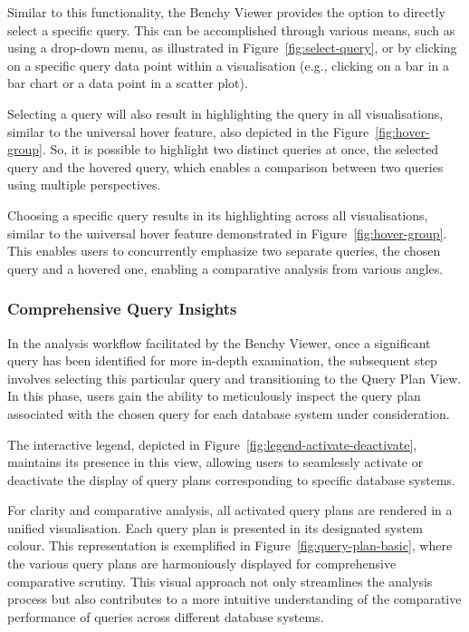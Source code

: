 Similar to this functionality, the Benchy Viewer provides the option to directly select a specific query. This can be accomplished through various means, such as using a drop-down menu, as illustrated in Figure~\ref{fig:select-query}, or by clicking on a specific query data point within a visualisation (e.g., clicking on a bar in a bar chart or a data point in a scatter plot).


Selecting a query will also result in highlighting the query in all visualisations, similar to the universal hover feature, also depicted in the Figure~\ref{fig:hover-group}. So, it is possible to highlight two distinct queries at once, the selected query and the hovered query, which enables a comparison between two queries using multiple perspectives. 

Choosing a specific query results in its highlighting across all visualisations, similar to the universal hover feature demonstrated in Figure~\ref{fig:hover-group}. This enables users to concurrently emphasize two separate queries, the chosen query and a hovered one, enabling a comparative analysis from various angles.

\subsubsection{Comprehensive Query Insights}

In the analysis workflow facilitated by the Benchy Viewer, once a significant query has been identified for more in-depth examination, the subsequent step involves selecting this particular query and transitioning to the Query Plan View. In this phase, users gain the ability to meticulously inspect the query plan associated with the chosen query for each database system under consideration.

The interactive legend, depicted in Figure~\ref{fig:legend-activate-deactivate}, maintains its presence in this view, allowing users to seamlessly activate or deactivate the display of query plans corresponding to specific database systems.

For clarity and comparative analysis, all activated query plans are rendered in a unified visualisation. Each query plan is presented in its designated system colour. This representation is exemplified in Figure~\ref{fig:query-plan-basic}, where the various query plans are harmoniously displayed for comprehensive comparative scrutiny. This visual approach not only streamlines the analysis process but also contributes to a more intuitive understanding of the comparative performance of queries across different database systems.

